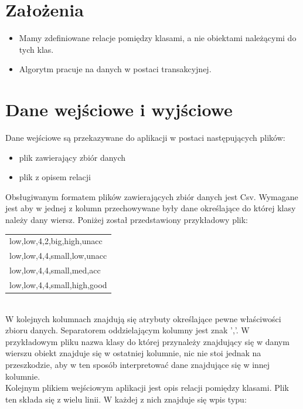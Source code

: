 \documentclass[a4paper,12pt]{article}
\begin{document}
\section{Założenia}

\begin{itemize}
\item Mamy zdefiniowane relacje pomiędzy klasami, a nie obiektami należącymi do tych klas.

\item Algorytm pracuje na danych w postaci transakcyjnej.
 
\end{itemize}

\section{Dane wejściowe i wyjściowe}
\label{opis_danych}
Dane wejściowe są przekazywane do aplikacji w postaci następujących plików:
\begin{itemize}
\item plik zawierający zbiór danych
\item plik z opisem relacji
\end{itemize}
Obsługiwanym formatem plików zawierających zbiór danych jest Csv. Wymagane jest aby w jednej z kolumn przechowywane były dane określające do której klasy należy dany wiersz. Poniżej został przedstawiony przykładowy plik: \\

\begin{tabular}{l}
low,low,4,2,big,high,unacc \\
low,low,4,4,small,low,unacc \\
low,low,4,4,small,med,acc \\
low,low,4,4,small,high,good \\
\end{tabular}
\\

W kolejnych kolumnach znajdują się atrybuty określające pewne właściwości zbioru danych. Separatorem oddzielającym kolumny jest znak ','. W przykładowym pliku nazwa klasy do której przynależy znajdujący się w danym wierszu obiekt znajduje się w ostatniej kolumnie, nic nie stoi jednak na przeszkodzie, aby w ten sposób interpretować dane znajdujące się w innej kolumnie. \\

Kolejnym plikiem wejściowym aplikacji jest opis relacji pomiędzy klasami. Plik ten składa się z wielu linii. W każdej z nich znajduje się wpis typu:\\
\end{document}
